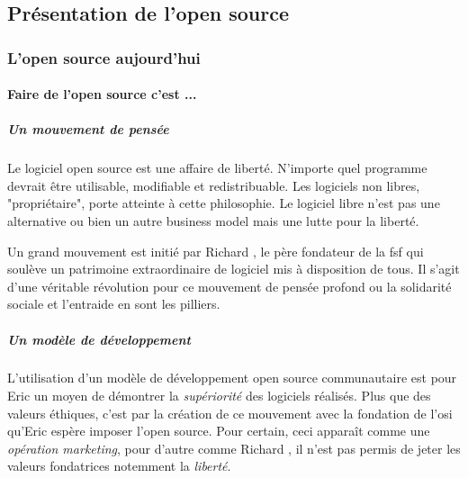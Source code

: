 \chapter{\color{burntorange}{Etat de l'art}} %


	\section{Présentation de l'open source} %

		\subsection{L'open source aujourd'hui}

			\subsubsection{Faire de l'open source c'est ...}

				\paragraph{Un mouvement de pensée\\}

					Le logiciel open source est une affaire de liberté. N'importe quel programme devrait être utilisable, modifiable et redistribuable. Les logiciels non libres, "propriétaire", porte atteinte à cette philosophie. Le logiciel libre n'est pas une alternative ou bien un autre business model mais une lutte pour la liberté.

					Un grand mouvement est initié par Richard , le père fondateur de la \acrshort{fsf} qui soulève un patrimoine extraordinaire de logiciel mis à disposition de tous. Il s'agit d'une véritable révolution pour ce mouvement de pensée profond ou la solidarité sociale et l'entraide en sont les pilliers.

				\paragraph{Un modèle de développement\\}

					L'utilisation d'un modèle de développement open source communautaire est pour Eric  un moyen de démontrer la \textit{supériorité} des logiciels réalisés. Plus que des valeurs éthiques, c'est par la création de ce mouvement avec la fondation de l'\acrshort{osi} qu'Eric  espère imposer l'open source. Pour certain, ceci apparaît comme une \textit{opération marketing}, pour d'autre comme Richard , il n'est pas permis de jeter les valeurs fondatrices notemment la \textit{liberté}. 

